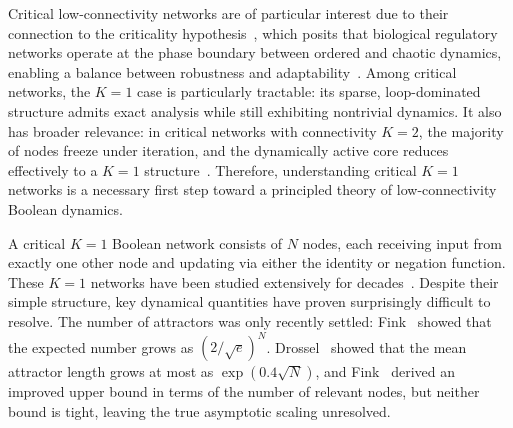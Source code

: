 \documentclass[11pt, reqno]{elsarticle}%
\theoremstyle{plain}
\newcounter{comments}
\newcommand{\sai}[1]{\addtocounter{comments}{1}{\color{red}[Sai \thecomments: #1]}}
\begin{document}



Critical low-connectivity networks are of particular interest due to their connection to the criticality hypothesis~\cite{kauffmanoriginsoforder,kauffmanfirst}, which posits that biological regulatory networks operate at the phase boundary between ordered and chaotic dynamics, enabling a balance between robustness and adaptability~\cite{aldana2007robustness,balleza2008critical,daniels2018criticality,kadelka2024meta}. 
Among critical networks, the $K=1$ case is particularly tractable: its sparse, loop-dominated structure admits exact analysis while still exhibiting nontrivial dynamics. 
It also has broader relevance: in critical networks with connectivity $K = 2$, the majority of nodes freeze under iteration, and the dynamically active core reduces effectively to a $K=1$ structure~\cite{drosselreview}.
Therefore, understanding critical $K=1$ networks is a necessary first step toward a principled theory of low-connectivity Boolean dynamics.


A critical $K=1$ Boolean network consists of $N$ nodes, each receiving input from exactly one other node and updating via either the identity or negation function. 
These $K=1$ networks have been studied extensively for decades~\cite{flybjergexact,drosselreview,Drosselcriticalk1network,loopsjapanesegroup,demongeot2010number}.
Despite their simple structure, key dynamical quantities have proven surprisingly difficult to resolve.
The number of attractors was only recently settled: Fink~\cite{finkexponential} showed that the expected number grows as $(2/\sqrt{e})^N$. 
Drossel~\cite{Drosselcriticalk1network} showed that the mean attractor length grows at most as $\exp(0.4\sqrt{N})$, and Fink~\cite{finkinsights} derived an improved upper bound in terms of the number of relevant nodes, but neither bound is tight, leaving the true asymptotic scaling unresolved.
\end{document}
